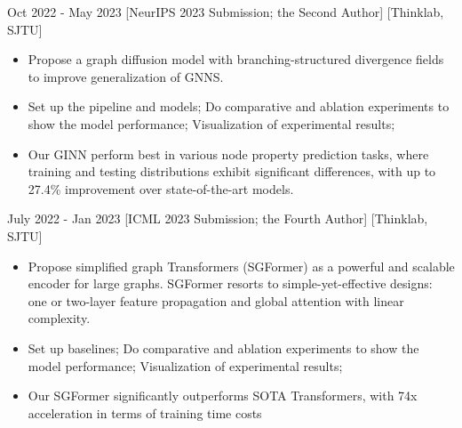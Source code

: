 \documentclass{chicv}
\begin{document}


{Oct 2022 - May 2023}
[NeurIPS 2023 Submission; the Second Author]
[Thinklab, SJTU]

\begin{itemize}
	\item Propose a graph diffusion model with branching-structured divergence fields to improve generalization of GNNS.
	\item Set up the pipeline and models; Do comparative and ablation experiments to show the model performance; Visualization of experimental results;
	\item Our GINN perform best in various node property prediction tasks, where training and testing distributions exhibit significant differences, with up to 27.4\% improvement over state-of-the-art models.
\end{itemize}


{July 2022 - Jan 2023}
[ICML 2023 Submission; the Fourth Author]
[Thinklab, SJTU]

\begin{itemize}
	\item Propose simplified graph Transformers (SGFormer) as a powerful and scalable encoder for large graphs. SGFormer resorts to simple-yet-effective designs: one or two-layer feature propagation and global attention with linear complexity.
	\item Set up baselines; Do comparative and ablation experiments to show the model performance; Visualization of experimental results;
	\item Our SGFormer significantly outperforms SOTA Transformers, with 74x acceleration in terms of training time costs
\end{itemize}
\end{document}
